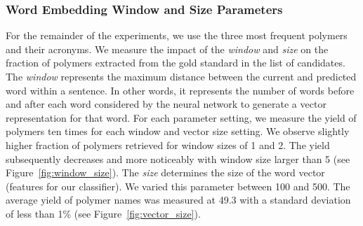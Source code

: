 \subsubsection{Word Embedding Window and Size Parameters}
For the remainder of the experiments, we use the three most frequent polymers and their acronyms. 
We measure the impact of the \textit{window} and \textit{size} on the fraction of polymers extracted from the gold standard in the list of  candidates.
The \textit{window} represents the maximum distance between the current and predicted word within a sentence. In other words, it represents the number of words before and after each word considered by the neural network to generate a vector representation for that word. 
For each parameter setting, we measure the yield of polymers ten times for each window and vector size setting.
We observe slightly higher fraction of polymers retrieved for window sizes of 1 and 2. The yield subsequently decreases and more noticeably with window size larger than 5 (see Figure~\ref{fig:window_size}).
The \textit{size} determines the size of the word vector (features for our classifier).
We varied this parameter between 100 and 500.
The average yield of polymer names was measured at 49.3 with a standard deviation of less than 1\% (see Figure~\ref{fig:vector_size}).


